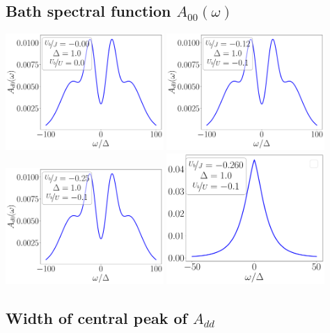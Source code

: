 \documentclass[10pt]{report}
\numberwithin{equation}{section}
\begin{document}
\subsection{Bath spectral function \(A_{00}(\omega)\)}
\begin{center}
	\includegraphics[width=0.45\textwidth]{../figures/spec_func_00_Ub_by_J=-0.000.pdf}
	\includegraphics[width=0.45\textwidth]{../figures/spec_func_00_Ub_by_J=-0.125.pdf}
	\includegraphics[width=0.45\textwidth]{../figures/spec_func_00_Ub_by_J=-0.250.pdf}
	\includegraphics[width=0.45\textwidth]{../figures/spec_func_00_Ub_by_J=-0.26.pdf}
\end{center}

\subsection{Width of central peak of \(A_{dd}\)}
\end{document}
